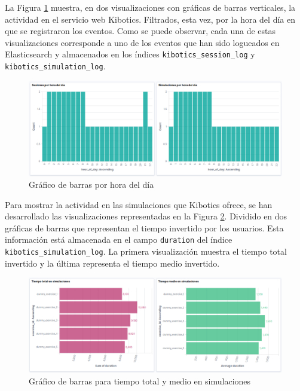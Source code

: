 \documentclass[a4paper, 12pt]{book}
\begin{document}
		La Figura \ref{fig:kibana_hourofday} muestra, en dos visualizaciones con gráficas de barras verticales, la actividad en el servicio web Kibotics. Filtrados, esta vez, por la hora del día en que se registraron los eventos. Como se puede observar, cada una de estas visualizaciones corresponde a uno de los eventos que han sido logueados en Elasticsearch y almacenados en los índices \texttt{kibotics\_session\_log} y \texttt{kibotics\_simulation\_log}.\\
		
		\begin{figure}[H]
			\centering
			\includegraphics[width=14cm, keepaspectratio]{img/kibana_04_hour_of_day}
			\caption{Gráfico de barras por hora del día}
			\label{fig:kibana_hourofday}
		\end{figure}
		
		Para mostrar la actividad en las simulaciones que Kibotics ofrece, se han desarrollado las visualizaciones representadas en la Figura \ref{fig:kibana_simulations}. Dividido en dos gráficas de barras que representan el tiempo invertido por los usuarios. Esta información está almacenada en el campo \texttt{duration} del índice \texttt{kibotics\_simulation\_log}. La primera visualización muestra el tiempo total invertido y la última representa el tiempo medio invertido. \\
		\begin{figure}[H]
			\centering
			\includegraphics[width=13cm, keepaspectratio]{img/kibana_05_simulations}
			\caption{Gráfico de barras para tiempo total y medio en simulaciones}
			\label{fig:kibana_simulations}
		\end{figure}
		
\end{document}
